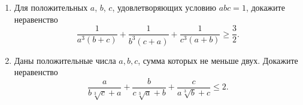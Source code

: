 \documentclass{article}
\begin{document}
\begin{enumerate}[label*=\protect\fbox{\arabic{enumi}}]
		
		\item Для положительных $a$, $b$, $c$, удовлетворяющих условию $abc=1$, докажите неравенство
		$$
		\frac{1}{a^3(b+c)}+\frac{1}{b^3(c+a)}+\frac{1}{c^3(a+b)} \geqslant \frac32.
		$$
		
		\item Даны положительные числа  $a,b,c$, сумма которых не меньше двух.
		Докажите неравенство
		$$\frac{a}{b\sqrt [3] {c}+a}+\frac{b}{c\sqrt [3] {a}+b}+\frac{c}{a\sqrt [3] {b}+c}\leqslant 2.$$
		
	\end{enumerate}
\end{document}
